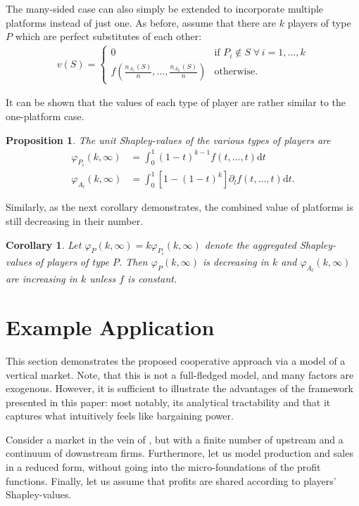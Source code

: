 \documentclass[a4paper]{article}
\newtheorem{proposition}{Proposition}
\newtheorem{corollary}{Corollary}
\newcommand{\dt}{\mathrm{d}t}
\begin{document}
The many-sided case can also simply be extended to incorporate multiple platforms instead of just one.
As before, assume that there are $k$ players of type $P$ which are perfect substitutes of each other:
\begin{align*}
    v(S) = \begin{cases}
        0                                                & \text{if } P_i \notin S \; \forall \, i = 1, \dots, k \\
        f\left(\frac{n_{A_1}(S)}{n}, \dots, \frac{n_{A_L}(S)}{n}\right) & \text{otherwise}.
    \end{cases}
\end{align*}

It can be shown that the values of each type of player are rather similar to the one-platform case.
\begin{proposition}
    The unit Shapley-values of the various types of players are
    \begin{align*}
        \varphi_{P_i}(k, \infty) & = \int_0^1 (1-t)^{k-1} f(t, \dots, t) \dt                                 \\
        \varphi_{A_l}(k, \infty)     & = \int_0^1 [1 - (1-t)^k] \partial_l f(t, \dots, t) \dt.
    \end{align*}
\end{proposition}

Similarly, as the next corollary demonstrates, the combined value of platforms is still decreasing in their number.
\begin{corollary}
    Let $\varphi_{P}(k, \infty) = k\varphi_{P_i}(k, \infty)$ denote the aggregated Shapley-values of players of type $P$.
    Then $\varphi_{P}(k, \infty)$ is decreasing in $k$ and $\varphi_{A_l}(k, \infty)$ are increasing in $k$ unless $f$ is constant.
\end{corollary}


\section{Example Application}

This section demonstrates the proposed cooperative approach via a model of a vertical market.
Note, that this is not a full-fledged model, and many factors are exogenous.
However, it is sufficient to illustrate the advantages of the framework presented in this paper: most notably, its analytical tractability and that it captures what intuitively feels like bargaining power.

Consider a market in the vein of \textcite{hart1990property}, but with a finite number of upstream and a continuum of downstream firms.
Furthermore, let us model production and sales in a reduced form, without going into the micro-foundations of the profit functions.
Finally, let us assume that profits are shared according to players' Shapley-values.
\end{document}
